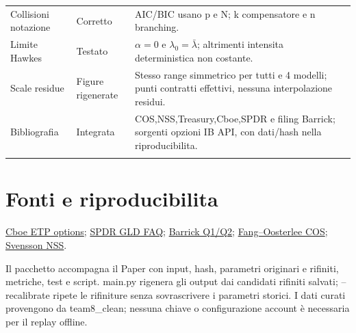\documentclass[10pt,a4paper]{article}
\begin{document}
\begin{longtable}{p{}p{}p{}}
Collisioni notazione & Corretto & AIC/BIC usano p e N; k compensatore e n branching. \\ \addlinespace
Limite Hawkes & Testato & $\alpha=0$ e $\lambda_0=\bar\lambda$; altrimenti intensita deterministica non costante. \\ \addlinespace
Scale residue & Figure rigenerate & Stesso range simmetrico per tutti e 4 modelli; punti contratti effettivi, nessuna interpolazione residui. \\ \addlinespace
Bibliografia & Integrata & COS,NSS,Treasury,Cboe,SPDR e filing Barrick; sorgenti opzioni IB API, con dati/hash nella riproducibilita. \\ \addlinespace
\bottomrule\end{longtable}
\section{Fonti e riproducibilita}
\href{https://www.cboe.com/exchange-traded-stock/etp-options-spec}{Cboe ETP options}; \href{https://files.spdrgoldshares.com/spdr-cms/2025-10/GLD-FAQs-January-2025.pdf}{SPDR GLD FAQ}; \href{https://www.barrick.com/English/investors/quarterly-reports/default.aspx}{Barrick Q1/Q2}; \href{https://ir.cwi.nl/pub/13283}{Fang--Oosterlee COS}; \href{https://www.nber.org/papers/w4871}{Svensson NSS}.
\par Il pacchetto accompagna il Paper con input, hash, parametri originari e rifiniti, metriche, test e script. main.py rigenera gli output dai candidati rifiniti salvati; --recalibrate ripete le rifiniture senza sovrascrivere i parametri storici. I dati curati provengono da team8\_clean; nessuna chiave o configurazione account è necessaria per il replay offline.
\end{document}
